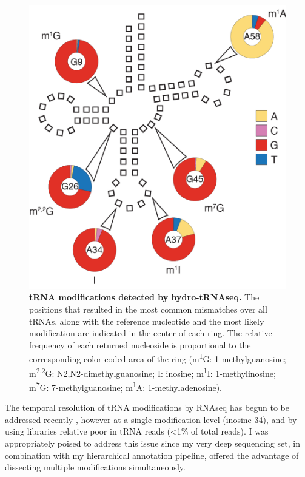 \documentclass[12pt]{rockefeller}
\newcommand{\super}[1]{\textsuperscript{#1}}
\begin{document}
\begin{figure}[!ht]%
\centering
\includegraphics[scale=1]{paper7a.png}%
\caption[tRNA modifications detected by hydro-tRNAseq.]
{\textbf{tRNA modifications detected by hydro-tRNAseq.}
The positions that resulted in the most common mismatches over all tRNAs, along with the reference nucleotide and the most likely modification are indicated in the center of each ring. The relative frequency of each returned nucleoside is proportional to the corresponding color-coded area of the ring (m\super{1}G: 1-methylguanosine; m\super{2,2}G: N2,N2-dimethylguanosine; I: inosine; m\super{1}I: 1-methylinosine; m\super{7}G: 7-methylguanosine; m\super{1}A: 1-methyladenosine).}
\centering
\label{paper7a}%
\end{figure}

The temporal resolution of tRNA modifications by RNAseq has begun to be addressed recently  \cite{Torres:2015ed}, however at a single modification level (inosine 34), and by using libraries relative poor in tRNA reads (<1\% of total reads). I was appropriately poised to address this issue since my very deep sequencing set, in combination with my hierarchical annotation pipeline, offered the advantage of dissecting multiple modifications simultaneously. 
\end{document}
